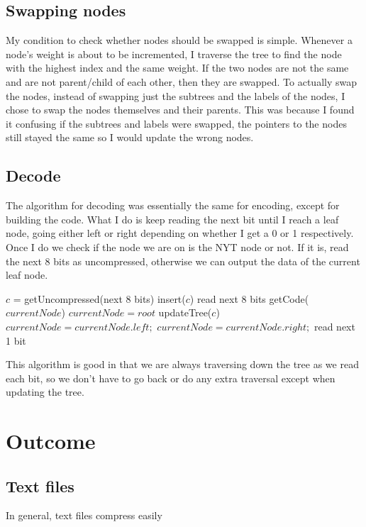 \documentclass{article}
\newcommand{\n}[0]{\newline}
\begin{document}
\subsection{Swapping nodes}
My condition to check whether nodes should be swapped is simple. Whenever a node's weight is about to be incremented, I traverse the tree to find the node with the highest index and the same weight. If the two nodes are not the same and are not parent/child of each other, then they are swapped. To actually swap the nodes, instead of swapping just the subtrees and the labels of the nodes, I chose to swap the nodes themselves and their parents. This was because I found it confusing if the subtrees and labels were swapped, the pointers to the nodes still stayed the same so I would update the wrong nodes. 
\subsection{Decode}
The algorithm for decoding was essentially the same for encoding, except for building the code. What I do is keep reading the next bit until I reach a leaf node, going either left or right depending on whether I get a 0 or 1 respectively. Once I do we check if the node we are on is the NYT node or not. If it is, read the next 8 bits as uncompressed, otherwise we can output the data of the current leaf node. 
\begin{algorithm}
\begin{algorithmic}
    		\State $c$ = getUncompressed(next 8 bits)
    		\State insert($c$)
    		\State read next 8 bits
    	\Else
    		\State getCode($currentNode$)
    	\EndIf
    	   \State $currentNode = root$
    	   \State updateTree($c$)
    \Else
    		\State $currentNode = currentNode.left;$
    	\Else
    		\State $currentNode = currentNode.right;$
    	\EndIf
    	\State read next 1 bit
    \EndIf
\EndWhile
\end{algorithmic}
\end{algorithm}
\n This algorithm is good in that we are always traversing down the tree as we read each bit, so we don't have to go back or do any extra traversal except when updating the tree.
\section{Outcome}	
\subsection{Text files}
In general, text files compress easily 
\end{document}
